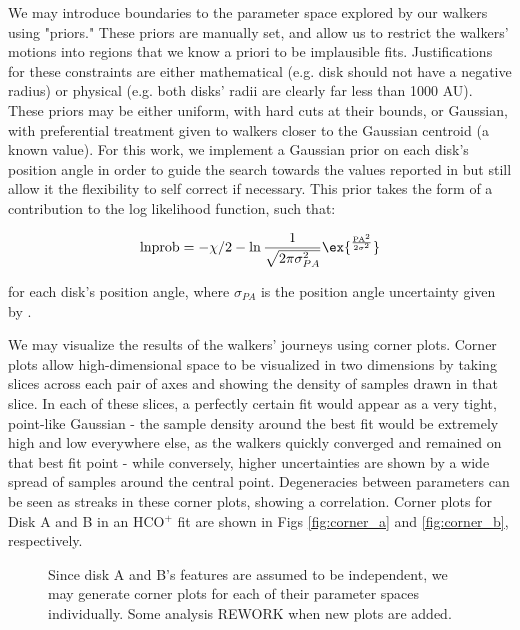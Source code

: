 We may introduce boundaries to the parameter space explored by our walkers using "priors." These priors are manually set, and allow us to restrict the walkers' motions into regions that we know a priori to be implausible fits. Justifications for these constraints are either mathematical (e.g. disk should not have a negative radius) or physical (e.g. both disks' radii are clearly far less than 1000 AU). These priors may be either uniform, with hard cuts at their bounds, or Gaussian, with preferential treatment given to walkers closer to the Gaussian centroid (a known value). For this work, we implement a Gaussian prior on each disk's position angle in order to guide the search towards the values reported in \citet{Williams2014} but still allow it the flexibility to self correct if necessary. This prior takes the form of a contribution to the log likelihood function, such that:

\begin{align}
  \text{lnprob} = -\chi/2  -\ln{\frac{1}{\sqrt{2 \pi \sigma_{PA}^2}}} \ex{^{\frac{\text{PA}^2}{2 \sigma^2}}}
\end{align}

for each disk's position angle, where $\sigma_{PA}$ is the position angle uncertainty given by \citet{Williams2014}.



We may visualize the results of the walkers' journeys using corner plots. Corner plots allow high-dimensional space to be visualized in two dimensions by taking slices across each pair of axes and showing the density of samples drawn in that slice. In each of these slices, a perfectly certain fit would appear as a very tight, point-like Gaussian - the sample density around the best fit would be extremely high and low everywhere else, as the walkers quickly converged and remained on that best fit point - while conversely, higher uncertainties are shown by a wide spread of samples around the central point. Degeneracies between parameters can be seen as streaks in these corner plots, showing a correlation. Corner plots for Disk A and B in an HCO$^+$ fit are shown in Figs \ref{fig:corner_a} and \ref{fig:corner_b}, respectively.


\begin{figure}[htp]
  \hspace*{\fill}%
  \hfill%
  \hspace*{\fill}%
  \caption{Since disk A and B's features are assumed to be independent, we may generate corner plots for each of their parameter spaces individually. Some analysis REWORK when new plots are added.}
  \label{fig:corner_plots}
\end{figure}





